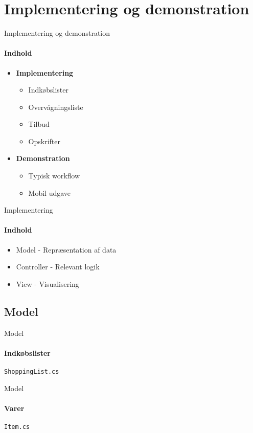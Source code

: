 \section{Implementering og demonstration}
\begin{frame}{Implementering og demonstration}
	\framesubtitle{Indhold}
    \begin{itemize}
    		\item \textbf{Implementering}
    		\begin{itemize}
	    	\item Indkøbslister
	    	\item Overvågningsliste
	    	\item Tilbud
	    	\item Opskrifter
        \end{itemize}
        \item \textbf{Demonstration} 
        \begin{itemize}
        \item Typisk workflow        
        \item Mobil udgave  
        \end{itemize}        
    \end{itemize}
\end{frame}

\begin{frame}{Implementering}
	\framesubtitle{Indhold}
	\begin{itemize}
	\item Model - Repræsentation af data
	\item Controller - Relevant logik
	\item View - Visualisering
	\end{itemize}	
\end{frame}

\subsection{Model}
\begin{frame}{Model}
	\framesubtitle{Indkøbslister}
	\texttt{ShoppingList.cs}
		
\end{frame}
\begin{frame}{Model}
	\framesubtitle{Varer}	
	\texttt{Item.cs}
		
\end{frame}

